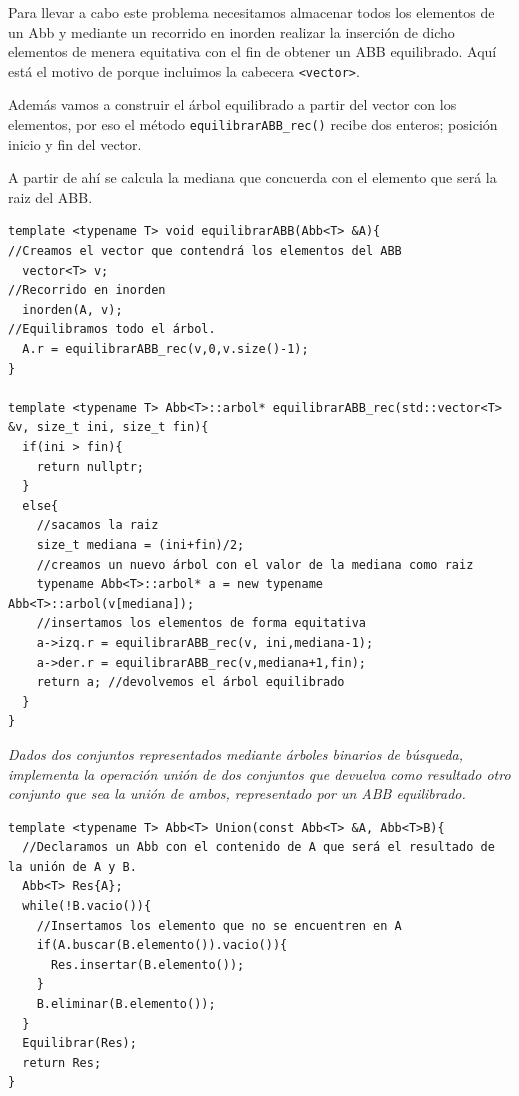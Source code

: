 Para llevar a cabo este problema necesitamos almacenar todos los elementos de un Abb y mediante un recorrido en inorden realizar la inserción de dicho elementos de menera equitativa con el fin de obtener un ABB equilibrado. Aquí está el motivo de porque incluimos la cabecera \texttt{<vector>}.

Además vamos a construir el árbol equilibrado a partir del vector con los elementos, por eso el método \texttt{equilibrarABB\_rec()} recibe dos enteros; posición inicio y fin del vector.

A partir de ahí se calcula la mediana que concuerda con el elemento que será la raiz del ABB.

\begin{verbatim}
template <typename T> void equilibrarABB(Abb<T> &A){
//Creamos el vector que contendrá los elementos del ABB
  vector<T> v;
//Recorrido en inorden
  inorden(A, v);
//Equilibramos todo el árbol.
  A.r = equilibrarABB_rec(v,0,v.size()-1);
}

template <typename T> Abb<T>::arbol* equilibrarABB_rec(std::vector<T> &v, size_t ini, size_t fin){
  if(ini > fin){
    return nullptr;
  }
  else{
    //sacamos la raiz
    size_t mediana = (ini+fin)/2;
    //creamos un nuevo árbol con el valor de la mediana como raiz
    typename Abb<T>::arbol* a = new typename Abb<T>::arbol(v[mediana]);
    //insertamos los elementos de forma equitativa
    a->izq.r = equilibrarABB_rec(v, ini,mediana-1);
    a->der.r = equilibrarABB_rec(v,mediana+1,fin);
    return a; //devolvemos el árbol equilibrado
  }
}
\end{verbatim}

\textbf{\large{}}\textit{ Dados dos conjuntos representados mediante árboles binarios de búsqueda, implementa la operación unión de dos conjuntos que devuelva como resultado otro conjunto que sea la unión de ambos, representado por un ABB equilibrado.}


\begin{verbatim}
template <typename T> Abb<T> Union(const Abb<T> &A, Abb<T>B){
  //Declaramos un Abb con el contenido de A que será el resultado de la unión de A y B.
  Abb<T> Res{A}; 
  while(!B.vacio()){
    //Insertamos los elemento que no se encuentren en A
    if(A.buscar(B.elemento()).vacio()){
      Res.insertar(B.elemento());
    }
    B.eliminar(B.elemento());
  }
  Equilibrar(Res);
  return Res;
}
\end{verbatim}

